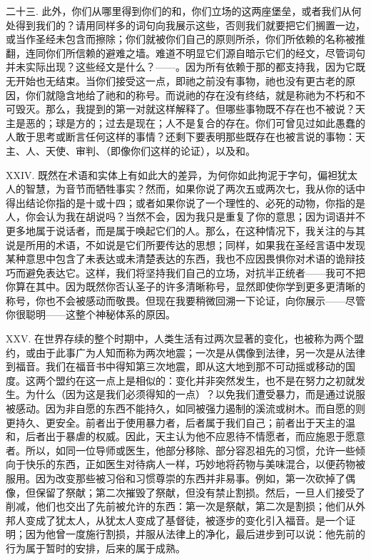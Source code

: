 二十三. 此外，你们从哪里得到你们的和，你们立场的这两座堡垒，或者我们从何处得到我们的？请用同样多的词句向我展示这些，否则我们就要把它们搁置一边，或当作圣经未包含而擦除；你们就被你们自己的原则所杀，你们所依赖的名称被推翻，连同你们所信赖的避难之墙。难道不明显它们源自暗示它们的经文，尽管词句并未实际出现？这些经文是什么？——。因为所有依赖于那的都支持我，因为它既无开始也无结束。当你们接受这一点，即祂之前没有事物，祂也没有更古老的原因，你们就隐含地给了祂和的称号。而说祂的存在没有终结，就是称祂为不朽和不可毁灭。那么，我提到的第一对就这样解释了。但哪些事物既不存在也不被说？天主是恶的；球是方的；过去是现在；人不是复合的存在。你们可曾见过如此愚蠢的人敢于思考或断言任何这样的事情？还剩下要表明那些既存在也被言说的事物：天主、人、天使、审判、（即像你们这样的论证），以及和。\par

XXIV. 既然在术语和实体上有如此大的差异，为何你如此拘泥于字句，偏袒犹太人的智慧，为音节而牺牲事实？然而，如果你说了两次五或两次七，我从你的话中得出结论你指的是十或十四；或者如果你说了一个理性的、必死的动物，你指的是人，你会认为我在胡说吗？当然不会，因为我只是重复了你的意思；因为词语并不更多地属于说话者，而是属于唤起它们的人。那么，在这种情况下，我关注的与其说是所用的术语，不如说是它们所要传达的思想；同样，如果我在圣经言语中发现某种意思中包含了未表达或未清楚表达的东西，我也不应因畏惧你对术语的诡辩技巧而避免表达它。这样，我们将坚持我们自己的立场，对抗半正统者——我可不把你算在其中。因为既然你否认圣子的许多清晰称号，显然即使你学到更多更清晰的称号，你也不会被感动而敬畏。但现在我要稍微回溯一下论证，向你展示——尽管你很聪明——这整个神秘体系的原因。\par

XXV. 在世界存续的整个时期中，人类生活有过两次显著的变化，也被称为两个盟约，或由于此事广为人知而称为两次地震；一次是从偶像到法律，另一次是从法律到福音。我们在福音书中得知第三次地震，即从这大地到那不可动摇或移动的国度。这两个盟约在这一点上是相似的：变化并非突然发生，也不是在努力之初就发生。为什么（因为这是我们必须得知的一点）？以免我们遭受暴力，而是通过说服被感动。因为非自愿的东西不能持久，如同被强力遏制的溪流或树木。而自愿的则更持久、更安全。前者出于使用暴力者，后者属于我们自己；前者出于天主的温和，后者出于暴虐的权威。因此，天主认为他不应恩待不情愿者，而应施恩于愿意者。所以，如同一位导师或医生，他部分移除、部分容忍祖先的习惯，允许一些倾向于快乐的东西，正如医生对待病人一样，巧妙地将药物与美味混合，以便药物被服用。因为改变那些被习俗和习惯尊崇的东西并非易事。例如，第一次砍掉了偶像，但保留了祭献；第二次摧毁了祭献，但没有禁止割损。然后，一旦人们接受了削减，他们也交出了先前被允许的东西：第一次是祭献，第二次是割损；他们从外邦人变成了犹太人，从犹太人变成了基督徒，被逐步的变化引入福音。是一个证明；因为他曾一度施行割损，并服从法律上的净化，最后进步到可以说：他先前的行为属于暂时的安排，后来的属于成熟。\par

